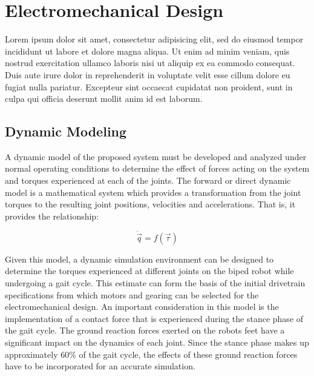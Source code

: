 \chapter{Electromechanical Design} %
\label{cha:design}
Lorem ipsum dolor sit amet, consectetur adipisicing elit, sed do eiusmod
tempor incididunt ut labore et dolore magna aliqua. Ut enim ad minim veniam,
quis nostrud exercitation ullamco laboris nisi ut aliquip ex ea commodo
consequat. Duis aute irure dolor in reprehenderit in voluptate velit esse
cillum dolore eu fugiat nulla pariatur. Excepteur sint occaecat cupidatat non
proident, sunt in culpa qui officia deserunt mollit anim id est laborum.


\section{Dynamic Modeling} %
\label{sec:chassis}

A dynamic model of the proposed system must be developed and analyzed under normal operating conditions to determine the effect of forces acting on the system and torques experienced at each of the joints. The forward or direct dynamic model is a mathematical system which provides a transformation from the joint torques to the resulting joint positions, velocities and accelerations. That is, it provides the relationship:

\begin{equation}
	\ddot{\vec{q}} = f(\vec{\tau})
\end{equation}

Given this model, a dynamic simulation environment can be designed to determine the torques experienced at different joints on the biped robot while undergoing a gait cycle. This estimate can form the basis of the initial drivetrain specifications from which motors and gearing can be selected for the electromechanical design. An important consideration in this model is the implementation of a contact force that is experienced during the stance phase of the gait cycle. The ground reaction forces exerted on the robots feet have a significant impact on the dynamics of each joint. Since the stance phase makes up approximately 60\% of the gait cycle, the effects of these ground reaction forces have to be incorporated for an accurate simulation. 

